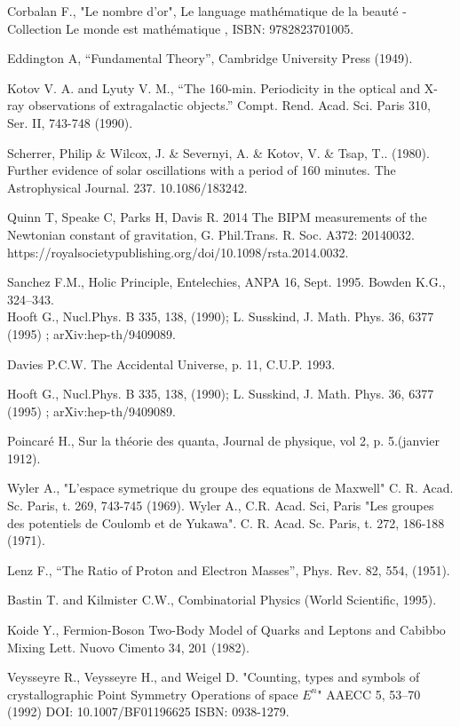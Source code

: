 \documentclass[a4paper,9pt]{article}
\begin{document}
\begin{thebibliography}{99}
 Corbalan F., "Le nombre d'or", Le language mathématique de la beauté - Collection Le monde est mathématique , ISBN: 9782823701005.

 Eddington A, ``Fundamental Theory'', Cambridge University Press (1949).

 Kotov V. A. and Lyuty V. M., “The 160-min. Periodicity in the optical and X-ray observations of extragalactic objects.” Compt. Rend. Acad. Sci. Paris 310, Ser. II, 743-748 (1990).

 Scherrer, Philip \& Wilcox, J. \& Severnyi, A. \& Kotov, V. \& Tsap, T.. (1980). Further evidence of solar oscillations with a period of 160 minutes. The Astrophysical Journal. 237. 10.1086/183242. 

 Quinn T, Speake C, Parks H, Davis R. 2014 The BIPM measurements of the Newtonian constant of gravitation, G. Phil.Trans. R. Soc. A372: 20140032. https://royalsocietypublishing.org/doi/10.1098/rsta.2014.0032.

  Sanchez F.M., Holic Principle, Entelechies, ANPA 16, Sept. 1995. Bowden K.G., 324--343.\\  Hooft G., Nucl.Phys. B 335, 138, (1990); L. Susskind, J. Math. Phys. 36, 6377 (1995) ; arXiv:hep-th/9409089.

 Davies P.C.W. The Accidental Universe, p. 11, C.U.P. 1993.

  Hooft G., Nucl.Phys. B 335, 138, (1990); L. Susskind, J. Math. Phys. 36, 6377 (1995) ; arXiv:hep-th/9409089.

 Poincaré H., Sur la théorie des quanta, Journal de physique, vol 2, p. 5.(janvier 1912).

 Wyler A., "L'espace symetrique du groupe des equations de Maxwell" C. R. Acad. Sc. Paris, t. 269, 743-745 (1969). Wyler A., C.R. Acad. Sci, Paris "Les groupes des potentiels de Coulomb et de Yukawa". C. R. Acad. Sc. Paris, t. 272, 186-188 (1971).


 Lenz F., “The Ratio of Proton and Electron Masses”, Phys. Rev. 82, 554, (1951).

 Bastin T. and Kilmister C.W., Combinatorial Physics (World Scientific, 1995).

 Koide Y., Fermion-Boson Two-Body Model of Quarks and Leptons and Cabibbo Mixing  Lett. Nuovo Cimento 34, 201 (1982).

 Veysseyre R., Veysseyre H., and Weigel D. "Counting, types and symbols of crystallographic Point Symmetry Operations of space $E^{n}$" AAECC 5, 53--70 (1992) DOI: 10.1007/BF01196625 ISBN: 0938-1279.


\end{thebibliography}
\end{document}

